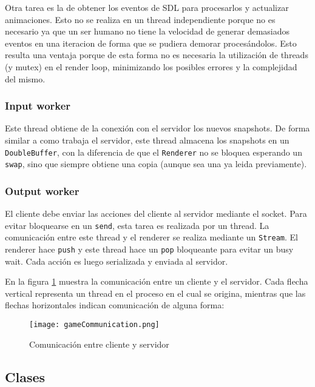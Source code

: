 Otra tarea es la de obtener los eventos de SDL para procesarlos y actualizar animaciones. Esto no se realiza
en un thread independiente porque no es necesario ya que un ser humano no tiene la velocidad de generar demasiados
eventos en una iteracion de forma que se pudiera demorar proces\'andolos. Esto resulta una ventaja porque de esta
forma no es necesaria la utilizaci\'on de threads (y mutex) en el render loop, minimizando los posibles errores
y la complejidad del mismo.


\subsubsection{Input worker}

Este thread obtiene de la conexi\'on con el servidor los nuevos snapshots. De forma similar a como trabaja el servidor,
este thread almacena los snapshots en un \texttt{DoubleBuffer}, con la diferencia de que el \texttt{Renderer} no
se bloquea esperando un \texttt{swap}, sino que siempre obtiene una copia (aunque sea una ya leida previamente).


\subsubsection{Output worker}

El cliente debe enviar las acciones del cliente al servidor mediante el socket. Para evitar bloquearse en un \texttt{send},
esta tarea es realizada por un thread. La comunicaci\'on entre este thread y el renderer se realiza mediante un
\texttt{Stream}. El renderer hace \texttt{push} y este thread hace un \texttt{pop} bloqueante para evitar un busy wait.
Cada acci\'on es luego serializada y enviada al servidor.


En la figura \ref{im:comunicacion} muestra la comunicaci\'on entre un cliente y el servidor. Cada flecha vertical representa un thread
en el proceso en el cual se origina, mientras que las flechas horizontales indican comunicaci\'on de alguna forma:

\begin{figure}
	\centering
	\texttt{[image: gameCommunication.png]}
	\caption{Comunicación entre cliente y servidor}
	\label{im:comunicacion}
\end{figure}

\subsection{Clases}

